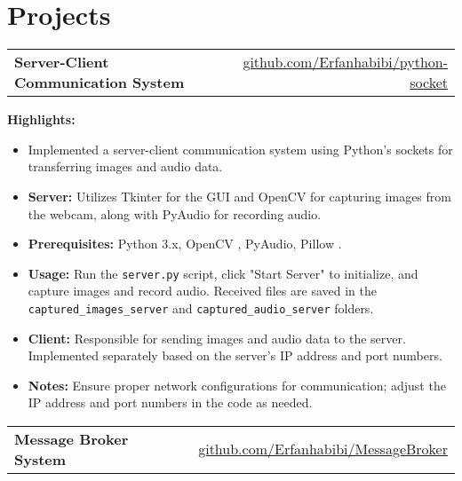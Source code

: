 \documentclass[10pt, a4paper]{article}
\begin{document}
\section{Projects}

\begin{tabularx}{\textwidth}{Xr}
    \textbf{Server-Client Communication System} & \href{https://github.com/Erfanhabibi/python-socket.git}{github.com/Erfanhabibi/python-socket} \\
\end{tabularx}

\vspace{0.1 cm}

\textbf{Highlights:}
\begin{itemize}
    \item Implemented a server-client communication system using Python's sockets for
          transferring images and audio data.
    \item \textbf{Server:} Utilizes Tkinter for the GUI and OpenCV for capturing images from the webcam, along with PyAudio for recording audio.
    \item \textbf{Prerequisites:} Python 3.x, OpenCV , PyAudio, Pillow .
    \item \textbf{Usage:} Run the \texttt{server.py} script, click "Start Server" to initialize, and capture images and record audio. Received files are saved in the \texttt{captured\_images\_server} and \texttt{captured\_audio\_server} folders.
    \item \textbf{Client:} Responsible for sending images and audio data to the server. Implemented separately based on the server's IP address and port numbers.
    \item \textbf{Notes:} Ensure proper network configurations for communication; adjust the IP address and port numbers in the code as needed.
\end{itemize}

\begin{tabularx}{\textwidth}{Xr}
    \textbf{Message Broker System} & \href{https://github.com/Erfanhabibi/MessageBroker}{github.com/Erfanhabibi/MessageBroker} \\
\end{tabularx}

\vspace{0.1 cm}
\end{document}
